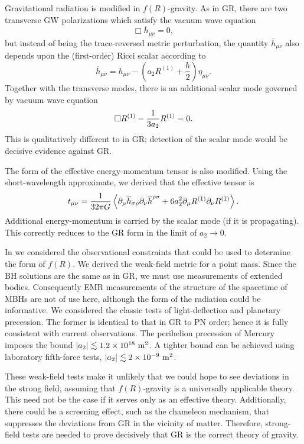 Gravitational radiation is modified in $f(R)$-gravity. As in GR, there are two transverse GW polarizations which satisfy the vacuum wave equation
\begin{equation}
\Box \overline{h}_{\mu\nu} = 0,
\end{equation}
but instead of being the trace-reversed metric perturbation, the quantity $\overline{h}_{\mu\nu}$ also depends upon the (first-order) Ricci scalar according to
\begin{equation}
\overline{h}_{\mu\nu} = h_{\mu\nu} - \left(a_2 R^{(1)} + \dfrac{h}{2}\right)\eta_{\mu\nu}.
\end{equation}
Together with the transverse modes, there is an additional scalar mode governed by vacuum wave equation
\begin{equation}
\Box R^{(1)} - \dfrac{1}{3 a_2} R^{(1)} = 0.
\end{equation}
This is qualitatively different to in GR; detection of the scalar mode would be decisive evidence against GR.

The form of the effective energy-momentum tensor is also modified. Using the short-wavelength approximate, we derived that the effective tensor is
\begin{equation}
t_{\mu\nu} = \dfrac{1}{32\pi G}\left\langle \partial_\mu\overline{h}_{\sigma\rho}\partial_\nu\overline{h}^{\rho\sigma} + 6a_2^2\partial_\mu R^{(1)}\partial_\nu R^{(1)} \right\rangle.
\end{equation}
Additional energy-momentum is carried by the scalar mode (if it is propagating). This correctly reduces to the GR form in the limit of $a_2 \rightarrow 0$.

In  we considered the observational constraints that could be used to determine the form of $f(R)$. We derived the weak-field metric for a point mass. Since the BH solutions are the same as in GR, we must use measurements of extended bodies. Consequently EMR measurements of the structure of the spacetime of MBHs are not of use here, although the form of the radiation could be informative. We considered the classic tests of light-deflection and planetary precession. The former is identical to that in GR to PN order; hence it is fully consistent with current observations. The perihelion precession of Mercury imposes the bound $|a_2| \lesssim 1.2 \times 10^{18}~\mathrm{m^2}$. A tighter bound can be achieved using laboratory fifth-force tests, $|a_2| \lesssim 2 \times 10^{-9}~\mathrm{m^2}$.

These weak-field tests make it unlikely that we could hope to see deviations in the strong field, assuming that $f(R)$-gravity is a universally applicable theory. This need not be the case if it serves only as an effective theory. Additionally, there could be a screening effect, such as the chameleon mechanism, that suppresses the deviations from GR in the vicinity of matter. Therefore, strong-field tests are needed to prove decisively that GR is the correct theory of gravity.

